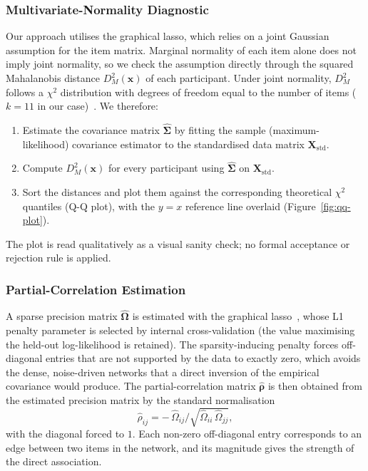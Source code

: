 \documentclass{article}
\begin{document}
\subsubsection{Multivariate-Normality Diagnostic}
Our approach utilises the graphical lasso, which relies on a joint
Gaussian assumption for the item matrix. Marginal normality of each
item alone does not imply joint normality, so we check the assumption
directly through the squared Mahalanobis distance $D_M^2(\mathbf{x})$
of each participant. Under joint normality, $D_M^2$ follows a $\chi^2$
distribution with degrees of freedom equal to the number of items
($k = 11$ in our case)~\parencite{johnson2007applied}. We therefore:
\begin{enumerate}
    \item Estimate the covariance matrix $\widehat{\boldsymbol{\Sigma}}$
        by fitting the sample (maximum-likelihood) covariance estimator
        to the standardised data matrix $\mathbf{X}_{\text{std}}$.

    \item Compute $D_M^2(\mathbf{x})$ for every participant using
        $\widehat{\boldsymbol{\Sigma}}$ on $\mathbf{X}_{\text{std}}$.

    \item Sort the distances and plot them against the corresponding theoretical $\chi^2$ quantiles (Q-Q plot), with the $y = x$ reference line overlaid (Figure~\ref{fig:qq-plot}).
\end{enumerate}
The plot is read qualitatively as a visual sanity check; no formal
acceptance or rejection rule is applied.

\subsubsection{Partial-Correlation Estimation}
A sparse precision matrix $\widehat{\boldsymbol{\Omega}}$ is estimated
with the graphical lasso~\parencite{friedman2008sparse}, whose L1
penalty parameter is selected by internal cross-validation (the value
maximising the held-out log-likelihood is retained). The
sparsity-inducing penalty forces off-diagonal entries that are not
supported by the data to exactly zero, which avoids the dense,
noise-driven networks that a direct inversion of the empirical
covariance would produce. The partial-correlation matrix
$\hat{\boldsymbol{\rho}}$ is then obtained from the estimated precision
matrix by the standard normalisation
\[
    \hat{\rho}_{ij} = -\,\widehat{\Omega}_{ij} \big/
        \sqrt{\widehat{\Omega}_{ii}\,\widehat{\Omega}_{jj}},
\]
with the diagonal forced to $1$. Each non-zero off-diagonal entry corresponds to an edge between two items in the network, and its magnitude gives the strength of the direct association.
\end{document}
